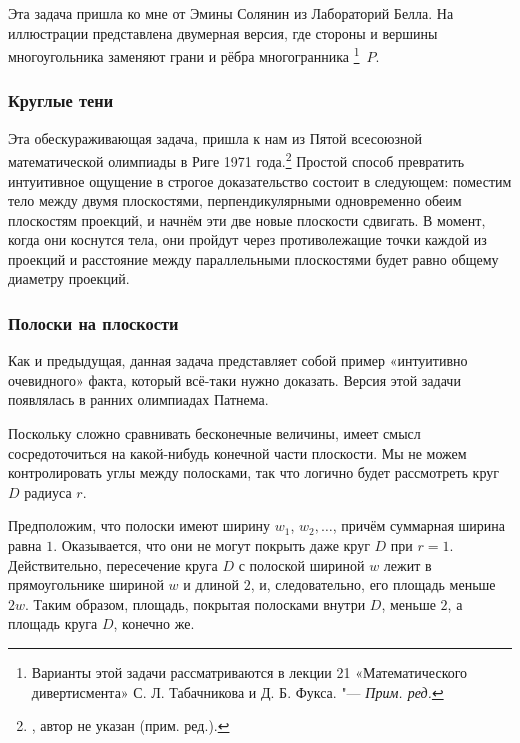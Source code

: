 \documentclass[twoside]{book}
\begin{document}
Эта задача пришла ко мне от Эмины Солянин %
из Лабораторий Белла.
На иллюстрации представлена двумерная версия, где стороны и вершины многоугольника заменяют грани и рёбра многогранника%
\footnote{Варианты этой задачи рассматриваются в лекции 21 «Математического дивертисмента» С. Л. Табачникова и Д. Б. Фукса. "--- \emph{Прим. ред.}}~$P$.

\subsubsection*{Круглые тени}%

Эта обескураживающая задача, пришла к нам из Пятой всесоюзной математической олимпиады в Риге 1971 года.\footnote{\cite[№150]{ВсМО}, автор не указан (прим. ред.).}
Простой способ превратить интуитивное ощущение в строгое доказательство состоит в следующем: поместим тело между двумя плоскостями, перпендикулярными одновременно обеим плоскостям проекций, и начнём  эти две новые плоскости сдвигать.
В  момент, когда они коснутся тела, они пройдут через противолежащие точки каждой из проекций и расстояние между параллельными плоскостями будет равно общему диаметру проекций.
\heart

\subsubsection*{Полоски на плоскости}%

Как и предыдущая, данная задача представляет собой пример «интуитивно очевидного» факта, который всё-таки нужно доказать.
Версия этой задачи появлялась в ранних олимпиадах Патнема.


Поскольку сложно сравнивать бесконечные величины, имеет смысл сосредоточиться на какой-нибудь конечной части плоскости.
Мы не можем контролировать углы между полосками, так что логично будет рассмотреть круг $D$ радиуса $r$.

Предположим, что полоски имеют ширину $w_1$, $w_2,\dots$, причём суммарная ширина равна $1$.
Оказывается, что они не могут покрыть даже круг $D$ при $r=1$.
Действительно, пересечение круга $D$ с полоской шириной $w$ лежит в прямоугольнике шириной $w$ и длиной $2$, и, следовательно, его площадь меньше $2w$.
Таким образом, площадь, покрытая полосками внутри $D$, меньше $2$, а площадь круга $D$, конечно же.
\heart 
\end{document}
